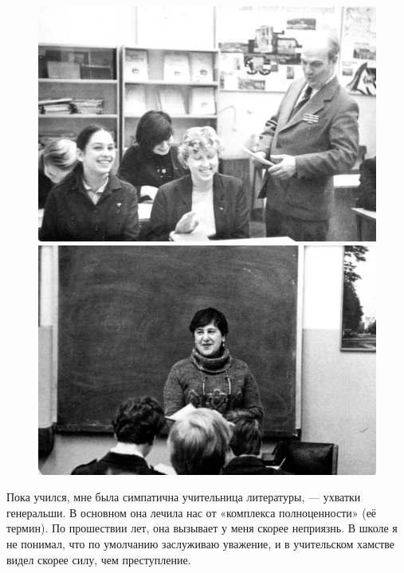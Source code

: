 \documentclass{book}
\begin{document}
\begin{figure}[!ht]
\begin{minipage}{.49\textwidth}
\centering
\includegraphics[scale=.5]{pics/eidelkind}
\end{minipage}
\hfill
\begin{minipage}{.49\textwidth}
\centering
\includegraphics[scale=.5]{pics/lebedeva}
\end{minipage}
\end{figure}

Пока учился, мне была симпатична учительница литературы, 
 --- ухватки генеральши.
В основном она лечила нас от «комплекса полноценности» (её термин).
По прошествии лет, она вызывает у меня скорее неприязнь.
В школе я не понимал, что по умолчанию заслуживаю уважение, и
в учительском хамстве видел скорее силу, чем преступление.
\end{document}
